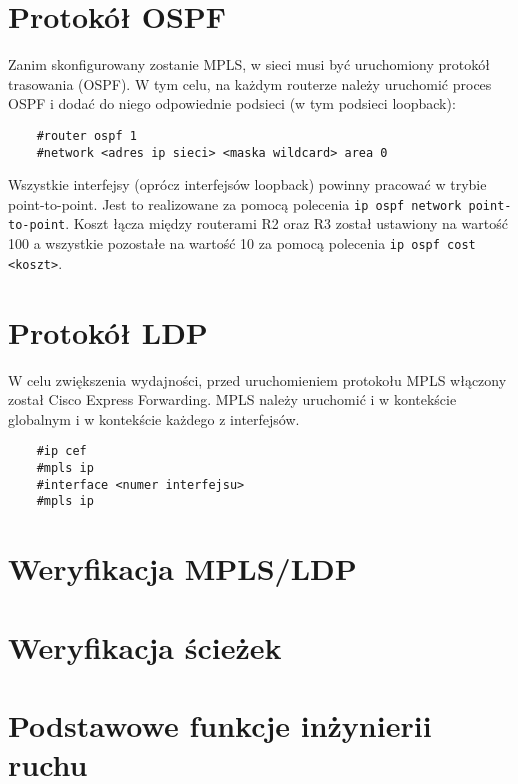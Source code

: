 \documentclass[a4paper,12pt,notitlepage]{article}
\begin{document}
\section{Protokół OSPF}

Zanim skonfigurowany zostanie MPLS, w sieci musi być uruchomiony protokół trasowania (OSPF). W tym celu, na każdym routerze należy uruchomić proces OSPF i dodać do niego odpowiednie podsieci (w tym podsieci loopback):
\begin{verbatim}
    #router ospf 1
    #network <adres ip sieci> <maska wildcard> area 0
\end{verbatim}

Wszystkie interfejsy (oprócz interfejsów loopback) powinny pracować w trybie point-to-point. Jest to realizowane za pomocą polecenia \texttt{ip ospf network point-to-point}. Koszt łącza między routerami R2 oraz R3 został ustawiony na wartość 100 a wszystkie pozostałe na wartość 10 za pomocą polecenia \texttt{ip ospf cost <koszt>}.


\section{Protokół LDP}

W celu zwiększenia wydajności, przed uruchomieniem protokołu MPLS włączony został Cisco Express Forwarding. MPLS należy uruchomić i w kontekście globalnym i w kontekście każdego z interfejsów.
\begin{verbatim}
    #ip cef
    #mpls ip
    #interface <numer interfejsu>
    #mpls ip
\end{verbatim}

\section{Weryfikacja MPLS/LDP}

\section{Weryfikacja ścieżek}

\section{Podstawowe funkcje inżynierii ruchu}
\end{document}
